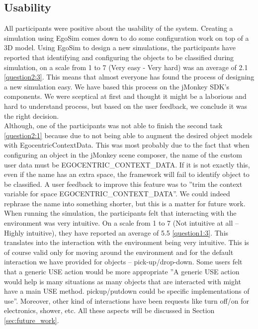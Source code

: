\subsection{Usability} %
\label{sec:eval_usability}
All participants were positive about the usability of the system. Creating a simulation using EgoSim comes down to do some configuration work on top of a 3D model. Using EgoSim to design a new simulations, the participants have reported that identifying and configuring the objects to be classified during simulation, on a scale from 1 to 7 (Very easy - Very hard) was an average of 2.1 \ref{question2:3}. This means that almost everyone has found the process of designing a new simulation easy. We have based this process on the jMonkey SDK's components. We were sceptical at first and thought it might be a laborious and hard to understand process, but based on the user feedback, we conclude it was the right decision.\\

Although, one of the participants was not able to finish the second task \ref{question2:1} because due to not being able to augment the desired object models with EgocentricContextData. This was most probably due to the fact that when configuring an object in the jMonkey scene composer, the name of the custom user data must be EGOCENTRIC\_CONTEXT\_DATA. If it is not exactly this, even if the name has an extra space, the framework will fail to identify object to be classified. A user feedback to improve this feature was to ''trim the context variable for space EGOCENTRIC\_CONTEXT\_DATA''. We could indeed rephrase the name into something shorter, but this is a matter for future work.\\

When running the simulation, the participants felt that interacting with the environment was very intuitive. On a scale from 1 to 7 (Not intuitive at all -- Highly intuitive), they have reported an average of 5.5 \ref{question1:3}. This translates into the interaction with the environment being very intuitive. This is of course valid only for moving around the environment and for the default interaction we have provided for objects -- pick-up/drop-down. Some users felt that a generic USE action would be more appropriate ''A generic USE action would help is many situations as many objects that are interacted with might have a main USE method. pickup/putdown could be specific implementations of use''. Moreover, other kind of interactions have been requests like turn off/on for electronics, shower, etc. All these aspects will be discussed in Section \ref{sec:future_work}.\\


